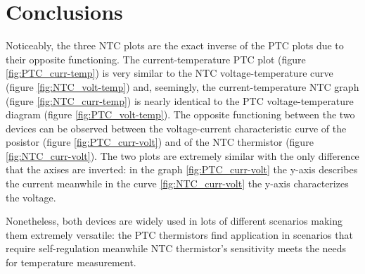 \vspace{30px}\section{Conclusions}
Noticeably, the three NTC plots are the exact inverse of the PTC plots due to their opposite functioning. The current-temperature PTC plot (figure \ref{fig:PTC_curr-temp}) is very similar to the NTC voltage-temperature curve (figure \ref{fig:NTC_volt-temp}) and, seemingly, the current-temperature NTC graph (figure \ref{fig:NTC_curr-temp}) is nearly identical to the PTC voltage-temperature diagram (figure \ref{fig:PTC_volt-temp}). The opposite functioning between the two devices can be observed between the voltage-current characteristic curve of the posistor (figure \ref{fig:PTC_curr-volt}) and of the NTC thermistor (figure \ref{fig:NTC_curr-volt}). The two plots are extremely similar with the only difference that the axises are inverted: in the graph \ref{fig:PTC_curr-volt} the y-axis describes the current meanwhile in the curve \ref{fig:NTC_curr-volt} the y-axis characterizes the voltage.

Nonetheless, both devices are widely used in lots of different scenarios making them extremely versatile: the PTC thermistors find application in scenarios that require self-regulation meanwhile NTC thermistor's sensitivity meets the needs for temperature measurement. 
